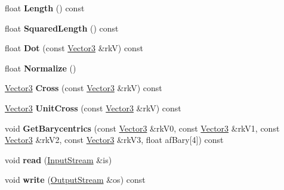 \begin{DoxyCompactItemize}
\item 
float {\bfseries Length} () const \hypertarget{class_i_dream_sky_1_1_vector3_a1e3ec2e499cb73c156ce9bc1198481d2}{}\label{class_i_dream_sky_1_1_vector3_a1e3ec2e499cb73c156ce9bc1198481d2}

\item 
float {\bfseries Squared\+Length} () const \hypertarget{class_i_dream_sky_1_1_vector3_afb285d4145acfba07e0f291dffa958b8}{}\label{class_i_dream_sky_1_1_vector3_afb285d4145acfba07e0f291dffa958b8}

\item 
float {\bfseries Dot} (const \hyperlink{class_i_dream_sky_1_1_vector3}{Vector3} \&rkV) const \hypertarget{class_i_dream_sky_1_1_vector3_a19ec81f3e8910f83e1d1487dc2a0aa31}{}\label{class_i_dream_sky_1_1_vector3_a19ec81f3e8910f83e1d1487dc2a0aa31}

\item 
float {\bfseries Normalize} ()\hypertarget{class_i_dream_sky_1_1_vector3_a53d092fe8f085b7681a8c6239d1da6a4}{}\label{class_i_dream_sky_1_1_vector3_a53d092fe8f085b7681a8c6239d1da6a4}

\item 
\hyperlink{class_i_dream_sky_1_1_vector3}{Vector3} {\bfseries Cross} (const \hyperlink{class_i_dream_sky_1_1_vector3}{Vector3} \&rkV) const \hypertarget{class_i_dream_sky_1_1_vector3_abbc6a5c99eaa8243783fd2104506e346}{}\label{class_i_dream_sky_1_1_vector3_abbc6a5c99eaa8243783fd2104506e346}

\item 
\hyperlink{class_i_dream_sky_1_1_vector3}{Vector3} {\bfseries Unit\+Cross} (const \hyperlink{class_i_dream_sky_1_1_vector3}{Vector3} \&rkV) const \hypertarget{class_i_dream_sky_1_1_vector3_a2f589e07fc31f8e732d22653b8c32c7c}{}\label{class_i_dream_sky_1_1_vector3_a2f589e07fc31f8e732d22653b8c32c7c}

\item 
void {\bfseries Get\+Barycentrics} (const \hyperlink{class_i_dream_sky_1_1_vector3}{Vector3} \&rk\+V0, const \hyperlink{class_i_dream_sky_1_1_vector3}{Vector3} \&rk\+V1, const \hyperlink{class_i_dream_sky_1_1_vector3}{Vector3} \&rk\+V2, const \hyperlink{class_i_dream_sky_1_1_vector3}{Vector3} \&rk\+V3, float af\+Bary\mbox{[}4\mbox{]}) const \hypertarget{class_i_dream_sky_1_1_vector3_a804f2a921907c56544ddf536efca03dd}{}\label{class_i_dream_sky_1_1_vector3_a804f2a921907c56544ddf536efca03dd}

\item 
void {\bfseries read} (\hyperlink{class_i_dream_sky_1_1_input_stream}{Input\+Stream} \&is)\hypertarget{class_i_dream_sky_1_1_vector3_a447f630909751dce240fae259238ce99}{}\label{class_i_dream_sky_1_1_vector3_a447f630909751dce240fae259238ce99}

\item 
void {\bfseries write} (\hyperlink{class_i_dream_sky_1_1_output_stream}{Output\+Stream} \&os) const \hypertarget{class_i_dream_sky_1_1_vector3_a147ffd1efd06ab4ab31ca3b1d6505bd0}{}\label{class_i_dream_sky_1_1_vector3_a147ffd1efd06ab4ab31ca3b1d6505bd0}

\end{DoxyCompactItemize}
